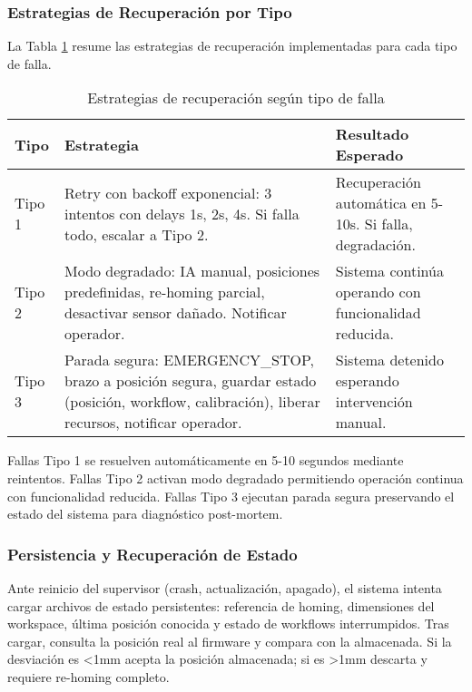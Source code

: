 \subsubsection{Estrategias de Recuperación por Tipo}

La Tabla \ref{tab:estrategias_recuperacion} resume las estrategias de recuperación implementadas para cada tipo de falla.

\begin{table}[H]
\centering
\caption{Estrategias de recuperación según tipo de falla}
\label{tab:estrategias_recuperacion}
\small
\begin{tabular}{|l|p{5.5cm}|p{5.5cm}|}
\hline
\textbf{Tipo} & \textbf{Estrategia} & \textbf{Resultado Esperado} \\
\hline
Tipo 1 & Retry con backoff exponencial: 3 intentos con delays 1s, 2s, 4s. Si falla todo, escalar a Tipo 2. & Recuperación automática en 5-10s. Si falla, degradación. \\
\hline
Tipo 2 & Modo degradado: IA manual, posiciones predefinidas, re-homing parcial, desactivar sensor dañado. Notificar operador. & Sistema continúa operando con funcionalidad reducida. \\
\hline
Tipo 3 & Parada segura: EMERGENCY\_STOP, brazo a posición segura, guardar estado (posición, workflow, calibración), liberar recursos, notificar operador. & Sistema detenido esperando intervención manual. \\
\hline
\end{tabular}
\end{table}

Fallas Tipo 1 se resuelven automáticamente en 5-10 segundos mediante reintentos. Fallas Tipo 2 activan modo degradado permitiendo operación continua con funcionalidad reducida. Fallas Tipo 3 ejecutan parada segura preservando el estado del sistema para diagnóstico post-mortem.

\subsubsection{Persistencia y Recuperación de Estado}

Ante reinicio del supervisor (crash, actualización, apagado), el sistema intenta cargar archivos de estado persistentes: referencia de homing, dimensiones del workspace, última posición conocida y estado de workflows interrumpidos. Tras cargar, consulta la posición real al firmware y compara con la almacenada. Si la desviación es <1mm acepta la posición almacenada; si es >1mm descarta y requiere re-homing completo.

